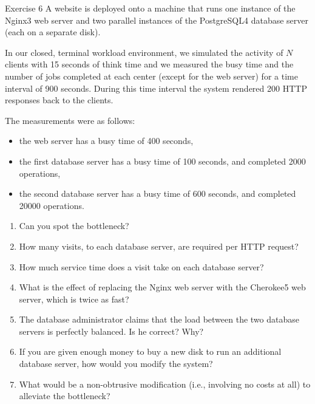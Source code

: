 \documentclass[handout]{beamer}
\begin{document}
\begin{frame}[allowframebreaks]{Exercise 6}
A website is deployed onto a machine that runs one instance of the Nginx3 web server and two parallel instances of the PostgreSQL4 database server (each on a separate disk).

In our closed, terminal workload environment, we simulated the activity of $N$ clients
with 15 seconds of think time and we measured the busy time and the number of jobs
completed at each center (except for the web server) for a time interval of 900 seconds.
During this time interval the system rendered 200 HTTP responses back to the clients.

The measurements were as follows:
\begin{itemize}
\item  the web server has a busy time of 400 seconds,
\item  the first database server has a busy time of 100 seconds, and completed 2000
operations,
\item the second database server has a busy time of 600 seconds, and completed 20000
operations.
\end{itemize}

\begin{enumerate}
\item
Can you spot the bottleneck?
\item
How many visits, to each database server, are required per HTTP request?
\item
How much service time does a visit take on each database server?
\item
What is the effect of replacing the Nginx web server with the Cherokee5 web server,
which is twice as fast?
\item
The database administrator claims that the load between the two database servers
is perfectly balanced. Is he correct? Why?
\item
If you are given enough money to buy a new disk to run an additional database
server, how would you modify the system?
\item
What would be a non-obtrusive modification (i.e., involving no costs at all) to
alleviate the bottleneck?
\end{enumerate}
\end{frame}
\end{document}
